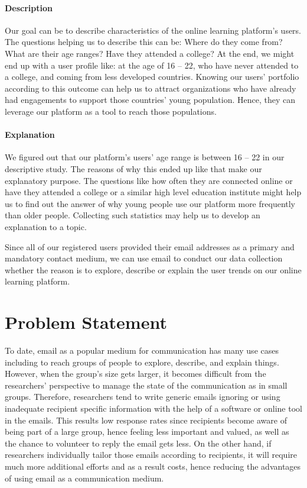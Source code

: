\paragraph{Description}
Our goal can be to describe characteristics of the online learning platform's users. The questions helping us to describe this can be: Where do they come from? What are their age ranges? Have they attended a college? At the end, we might end up with a user profile like: at the age of 16 -- 22, who have never attended to a college, and coming from less developed countries. Knowing our users' portfolio according to this outcome can help us to attract organizations who have already had engagements to support those countries' young population. Hence, they can leverage our platform as a tool to reach those populations.

\paragraph{Explanation}
We figured out that our platform's users' age range is between 16 -- 22 in our descriptive study. The reasons of why this ended up like that make our explanatory purpose. The questions like how often they are connected online or have they attended a college or a similar high level education institute might help us to find out the answer of why young people use our platform more frequently than older people. Collecting such statistics may help us to develop an explanation to a topic.

\vspace{1cm}
Since all of our registered users provided their email addresses as a primary and mandatory contact medium, we can use email to conduct our data collection whether the reason is to explore, describe or explain the user trends on our online learning platform.

\section{Problem Statement}
\label{sec:2:Problem}

To date, email as a popular medium for communication has many use cases including to reach groups of people to explore, describe, and explain things. However, when the group's size gets larger, it becomes difficult from the researchers' perspective to manage the state of the communication as in small groups. Therefore, researchers tend to write generic emails ignoring or using inadequate recipient specific information with the help of a software or online tool in the emails. This results low response rates since recipients become aware of being part of a large group, hence feeling less important and valued, as well as the chance to volunteer to reply the email gets less. On the other hand, if researchers individually tailor those emails according to recipients, it will require much more additional efforts and as a result costs, hence reducing the advantages of using email as a communication medium.
\vspace{1cm}

